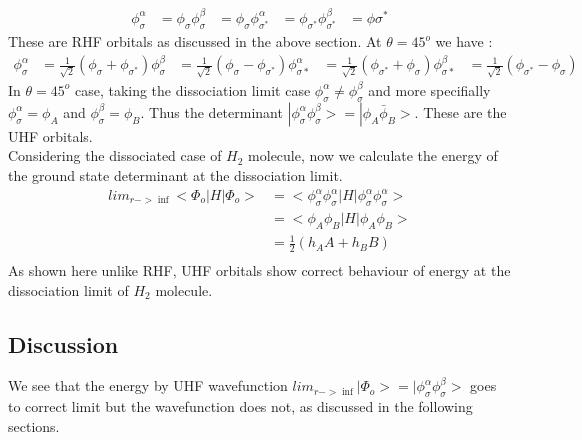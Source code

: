 \documentclass[11pt]{article}   	%
\begin{document}
	\begin{equation}
	\begin{split}
		\phi_{\sigma}^{\alpha}&=\phi_{\sigma}
		\phi_{\sigma}^{\beta}&=\phi_{\sigma}
		\phi_{\sigma^*}^{\alpha}&=\phi_{\sigma^*}
		\phi_{\sigma^*}^{\beta}&=\phi{\sigma^*}
	\end{split}
	\end{equation}
	These are RHF orbitals as discussed in the above section. At $\theta=45^o$ we have :\\
	\begin{equation}
	\begin{split}
		\phi_{\sigma}^{\alpha}&=\frac{1}{\sqrt{2}}(\phi_{\sigma}+\phi_{\sigma^*})
		\phi_{\sigma}^{\beta}&=\frac{1}{\sqrt{2}}(\phi_{\sigma}-\phi_{\sigma^*})
		\phi_{\sigma*}^{\alpha}&=\frac{1}{\sqrt{2}}(\phi_{\sigma^*}+\phi_{\sigma})
		\phi_{\sigma*}^{\beta}&=\frac{1}{\sqrt{2}}(\phi_{\sigma^*}-\phi_{\sigma})
	\end{split}
	\end{equation}
	In $\theta=45^o$ case, taking the dissociation limit case $\phi_{\sigma}^{\alpha}\neq \phi_{\sigma}^{\beta}$ and more specifially
	$\phi_{\sigma}^{\alpha}=\phi_A$ and $\phi_{\sigma}^{\beta}=\phi_B$. Thus the determinant $|\phi_{\sigma}^{\alpha}\phi_{\sigma}^{\beta}>
	=|\phi_A\bar{\phi}_B>$. These are the UHF orbitals.\\ 
	Considering the dissociated case of $H_2$ molecule, now we calculate the energy of the ground state determinant at the dissociation limit. \\
	\begin{equation}
		\begin{split}
			lim_{r->\inf}<\Phi_o|H|\Phi_o>&=<\phi_{\sigma}^{\alpha}\phi_{\sigma}^{\alpha}|H|\phi_{\sigma}^{\alpha}\phi_{\sigma}^{\alpha}>\\
				&=<\phi_A\phi_B|H|\phi_A\phi_B>\\
				&=\frac{1}{2}(h_AA+h_BB)\\
		\end{split}
	\end{equation}
	As shown here unlike RHF, UHF orbitals show correct behaviour of energy at the dissociation limit of $H_2$ molecule.\\
	\subsection{Discussion}
	We see that the energy by UHF wavefunction $lim_{r->\inf}|\Phi_o>=|\phi_{\sigma}^{\alpha}\phi_{\sigma}^{\beta}>$ goes to
	correct limit but the wavefunction does not, as discussed in the following sections. \\
\end{document}
